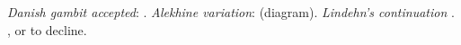 \hspace{5mm}
\begin{minipage}[t]{.175\linewidth}
\raggedright
\begin{center}
\scalebox{.560}{\showboard}
\end{center}
\newgame
\emph{Danish gambit accepted}: .
\emph{Alekhine variation}:  (diagram).
\emph{Lindehn's continuation} .
,  or  to decline.
\vspace{2mm}
\end{minipage}
\hspace{5mm}

